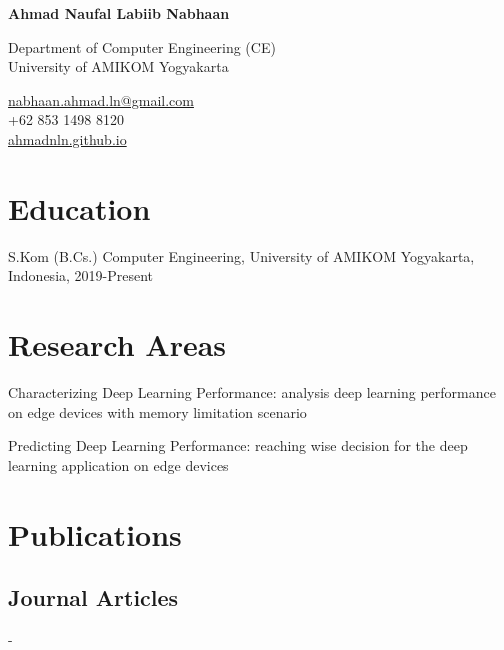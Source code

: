 \documentclass[12pt,letterpaper]{report}
\newcommand{\myname}{Ahmad Naufal Labiib Nabhaan}
\newcommand{\namefont}[1]{{\normalfont\bfseries\Huge{#1}}}
\newcommand{\listitemspace}{0.25em}
\renewenvironment{itemize}
{\begin{list}{}{\setlength{\leftmargin}{0em}
                \setlength{\parskip}{0em}
                \setlength{\itemsep}{\listitemspace}
                \setlength{\parsep}{\listitemspace}}}
{\end{list}}
\begin{document}
    \raggedright{}

    \namefont{\myname}

    \vspace{1em}
    \begin{minipage}[t]{0.700\textwidth}
        Department of Computer Engineering (CE)\\
        University of AMIKOM Yogyakarta
    \end{minipage}
    \begin{minipage}[t]{0.295\textwidth}
        \flushright{}
        \href{mailto:nabhaan.ahmad.ln@gmail.com}{nabhaan.ahmad.ln@gmail.com} \\
        +62 853 1498 8120 \\
        \href{https://administrator2992.github.io}{ahmadnln.github.io}
    \end{minipage}

    \section*{Education}
    
    \begin{tablist}
      \item[S.Kom (B.Cs.)] \tab{}Computer Engineering, University of AMIKOM Yogyakarta, Indonesia, 2019-Present
    \end{tablist}
    
    \section*{Research Areas}
    \begin{itemize}
      \item Characterizing Deep Learning Performance: analysis deep learning performance on edge devices with memory limitation scenario
      \item Predicting Deep Learning Performance: reaching wise decision for the deep learning application on edge devices
    \end{itemize}
    
    \section*{Publications}
    \subsection*{Journal Articles}
    \begin{tablist}
        \item[-] \tab{}\fullcite{-}
    \end{tablist}
\end{document}
